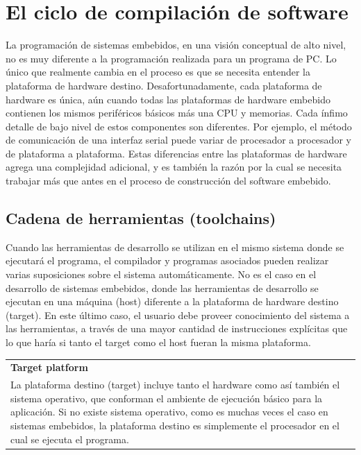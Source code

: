 \documentclass[output=paper, 
colorlinks,
citecolor=brown,
newtxmath
]{langscibook}
\begin{document}

\section {El ciclo de compilación de software}

La programación de sistemas embebidos, en una visión conceptual de alto nivel, 
no es muy diferente a la programación realizada para un programa de PC. Lo único que 
realmente cambia en el proceso es 
que se necesita entender la plataforma de hardware destino. 
Desafortunadamente, cada plataforma de hardware es única, aún cuando
todas las plataformas de hardware embebido contienen los mismos periféricos
básicos más una CPU y memorias. Cada ínfimo detalle de bajo nivel de estos 
componentes son diferentes. Por ejemplo, el método de comunicación
de una interfaz serial puede variar de procesador a procesador 
y de plataforma a plataforma.
Estas diferencias entre las plataformas de hardware
agrega una complejidad adicional, y es también la razón
por la cual se necesita trabajar más que antes en el proceso 
de construcción del software embebido.

\subsection {Cadena de herramientas (toolchains)}

Cuando las herramientas de desarrollo se utilizan en el mismo sistema 
donde se ejecutará el programa, el compilador y programas asociados
pueden realizar varias suposiciones sobre el sistema automáticamente.
No es el caso en el desarrollo de sistemas embebidos, donde las herramientas
de desarrollo se ejecutan en una máquina (host) diferente a la plataforma
de hardware destino (target). En este último caso, el usuario debe proveer 
conocimiento del sistema a las herramientas, a través 
de una mayor cantidad de instrucciones explícitas que lo que haría
si tanto el target como el host fueran la misma plataforma.

 
\begin{center}
\begin{tabularx}{0.95\textwidth}{|X|}
\hline
\rowcolor{lightgray}
\textbf{Target platform}\\
\rowcolor{aliceblue}
La plataforma destino (target) incluye tanto el hardware como así
también el sistema operativo, que conforman el ambiente de ejecución
básico para la aplicación. Si no existe sistema operativo, como es
muchas veces el caso en sistemas embebidos, la plataforma destino
es simplemente el procesador en el cual se ejecuta el  programa.\\
\hline
\end{tabularx}
\end{center}
\end{document}

